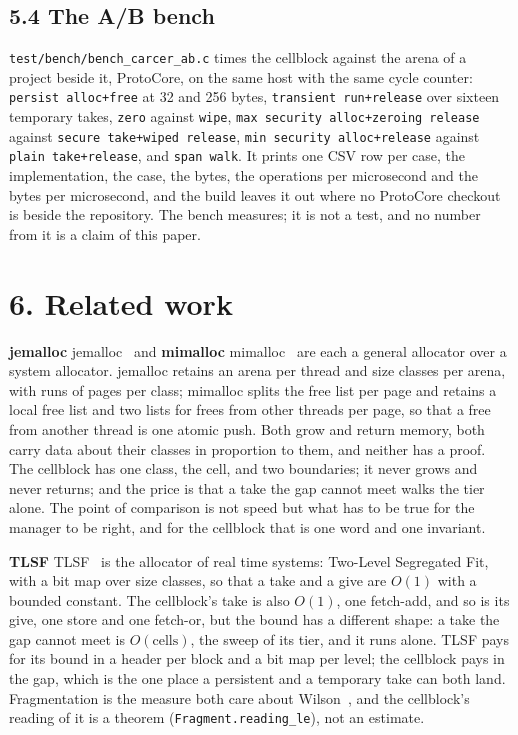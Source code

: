 \subsection{\texorpdfstring{5.4 The A/B bench}{5.4 The A/B bench}}

\texttt{test/\allowbreak{}bench/\allowbreak{}bench\_\allowbreak{}carcer\_\allowbreak{}ab.\allowbreak{}c} times the cellblock against the arena of a project beside it, ProtoCore, on the same host with the same cycle counter: \texttt{persist alloc+free} at 32 and 256 bytes, \texttt{transient run+release} over sixteen temporary takes, \texttt{zero} against \texttt{wipe}, \texttt{max security alloc+zeroing release} against \texttt{secure take+wiped release}, \texttt{min security alloc+release} against \texttt{plain take+release}, and \texttt{span walk}. It prints one CSV row per case, the implementation, the case, the bytes, the operations per microsecond and the bytes per microsecond, and the build leaves it out where no ProtoCore checkout is beside the repository. The bench measures; it is not a test, and no number from it is a claim of this paper.

\section{\texorpdfstring{6. Related work}{6. Related work}}

\textbf{jemalloc} jemalloc~\cite{src:jemalloc} and \textbf{mimalloc} mimalloc~\cite{src:mimalloc} are each a general allocator over a system allocator. jemalloc retains an arena per thread and size classes per arena, with runs of pages per class; mimalloc splits the free list per page and retains a local free list and two lists for frees from other threads per page, so that a free from another thread is one atomic push. Both grow and return memory, both carry data about their classes in proportion to them, and neither has a proof. The cellblock has one class, the cell, and two boundaries; it never grows and never returns; and the price is that a take the gap cannot meet walks the tier alone. The point of comparison is not speed but what has to be true for the manager to be right, and for the cellblock that is one word and one invariant.

\textbf{TLSF} TLSF~\cite{src:TLSF} is the allocator of real time systems: Two-Level Segregated Fit, with a bit map over size classes, so that a take and a give are \(O(1)\) with a bounded constant. The cellblock's take is also \(O(1)\), one fetch-add, and so is its give, one store and one fetch-or, but the bound has a different shape: a take the gap cannot meet is \(O(\text{cells})\), the sweep of its tier, and it runs alone. TLSF pays for its bound in a header per block and a bit map per level; the cellblock pays in the gap, which is the one place a persistent and a temporary take can both land. Fragmentation is the measure both care about Wilson~\cite{src:Wilson}, and the cellblock's reading of it is a theorem (\texttt{Fragment.\allowbreak{}reading\_\allowbreak{}le}), not an estimate.

